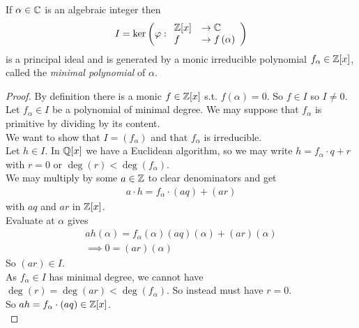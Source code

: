 \documentclass[a4paper]{article}
\begin{document}
\begin{prop}
If $\alpha\in\mathbb{C}$ is an algebraic integer then
\begin{equation*}
\begin{aligned}
I= \ker \left(\varphi:
\begin{array}{ll}
\mathbb{Z}[x] &\to\mathbb{C}\\
f &\to f\left(\alpha\right)
\end{array}
\right)
\end{aligned}
\end{equation*}
is a principal ideal and is generated by a monic irreducible polynomial $f_\alpha\in\mathbb{Z}[x]$, called the \emph{minimal polynomial} of $\alpha$.
\begin{proof}
By definition there is a monic $f\in\mathbb{Z}[x]$ s.t. $f\left(\alpha\right)=0$. So $f\in I$ so $I\neq 0$.\\
Let $f_\alpha\in I$ be a polynomial of minimal degree. We may suppose that $f_\alpha$ is primitive by dividing by its content.\\
We want to show that $I=\left(f_\alpha\right)$ and that $f_\alpha$ is irreducible.\\
Let $h\in I$. In $\mathbb{Q}[x]$ we have a Euclidean algorithm, so we may write $h=f_\alpha \cdot q+r$ with $r=0$ or $\deg\left(r\right)<\deg\left(f_\alpha\right)$.\\
We may multiply by some $a\in\mathbb{Z}$ to clear denominators and get
\begin{equation*}
\begin{aligned}
a\cdot h = f_\alpha \cdot \left(aq\right) + \left(ar\right)
\end{aligned}
\end{equation*}
with $aq$ and $ar$ in $\mathbb{Z}[x]$.\\
Evaluate at $\alpha$ gives
\begin{equation*}
\begin{aligned}
ah\left(\alpha\right) = f_\alpha\left(\alpha\right)\left(aq\right)\left(\alpha\right) + \left(ar\right)\left(\alpha\right)\\
\implies 0=\left(ar\right)\left(\alpha\right)
\end{aligned}
\end{equation*}
So $\left(ar\right)\in I$.\\
As $f_\alpha\in I$ has minimal degree, we cannot have $\deg\left(r\right)=\deg\left(ar\right)<\deg\left(f_\alpha\right)$. So instead must have $r=0$.\\
So $ah = f_\alpha \cdot\left(aq\right) \in \mathbb{Z}[x]$.\\

\end{proof}
\end{prop}
\end{document}
